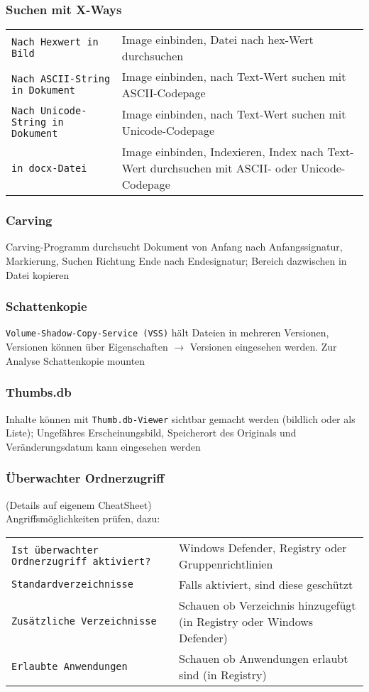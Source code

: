 \subsubsection{Suchen mit X-Ways}
\begin{tabular}{@{}p{\the\MyLen}%
		@{}p{\linewidth-\the\MyLen}@{}}
	\texttt{Nach Hexwert in Bild} & Image einbinden, Datei nach hex-Wert durchsuchen\\
	\texttt{Nach ASCII-String in Dokument} & Image einbinden, nach Text-Wert suchen mit ASCII-Codepage \\
	\texttt{Nach Unicode-String in Dokument} & Image einbinden, nach Text-Wert suchen mit Unicode-Codepage\\
	\texttt{in docx-Datei} & Image einbinden, Indexieren, Index nach Text-Wert durchsuchen mit ASCII- oder Unicode-Codepage
\end{tabular}

\subsubsection{Carving}
Carving-Programm durchsucht Dokument von Anfang nach Anfangssignatur, Markierung, Suchen Richtung Ende nach Endesignatur; Bereich dazwischen in Datei kopieren

\subsubsection{Schattenkopie}
\texttt{Volume-Shadow-Copy-Service (VSS)} hält Dateien in mehreren Versionen, Versionen können über Eigenschaften $\rightarrow$ Versionen eingesehen werden. Zur Analyse Schattenkopie mounten

\subsubsection{Thumbs.db}
Inhalte können mit \texttt{Thumb.db-Viewer} sichtbar gemacht werden (bildlich oder als Liste); Ungefähres Erscheinungsbild, Speicherort des Originals und Veränderungsdatum kann eingesehen werden

\subsubsection{Überwachter Ordnerzugriff}
(Details auf eigenem CheatSheet)\\
Angriffsmöglichkeiten prüfen, dazu:
\begin{tabular}{@{}p{\the\MyLen}%
		@{}p{\linewidth-\the\MyLen}@{}}
	\texttt{Ist überwachter Ordnerzugriff aktiviert?} &  Windows Defender, Registry oder Gruppenrichtlinien\\
	\texttt{Standardverzeichnisse} & Falls aktiviert, sind diese geschützt\\
	\texttt{Zusätzliche Verzeichnisse} & Schauen ob Verzeichnis hinzugefügt (in Registry oder Windows Defender)\\
	\texttt{Erlaubte Anwendungen} & Schauen ob Anwendungen erlaubt sind (in Registry)\\
\end{tabular}

